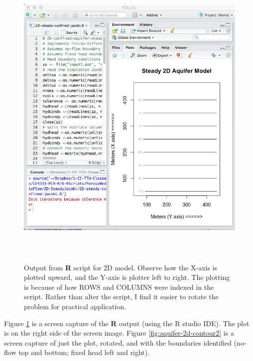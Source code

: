 \begin{figure}[h!] %
   \centering
   \includegraphics[height=6in]{./17-SteadyGroundwaterFlow/aquifer-2d-contour1.jpg} 
   \caption{Output from \textbf{R} script for 2D model.  Observe how the X-axis is plotted upward, and the Y-axis is plotter left to right.  The plotting is because of how ROWS and COLUMNS were indexed in the script.  Rather than alter the script, I find it easier to rotate the problem for practical application.}
   \label{fig:aquifer-2d-contour1}
\end{figure}
Figure \ref{fig:aquifer-2d-contour1} is a screen capture of the \textbf{R} output (using the R studio IDE).   The plot is on the right side of the screen image.
Figure \ref{fig:aquifer-2d-contour2} is a screen capture of just the plot, rotated, and with the boundaries identified (no-flow top and bottom; fixed head left and right).

